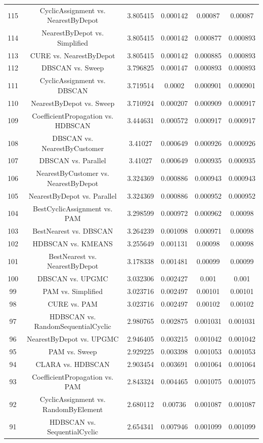 \documentclass[a4paper,10pt]{article}
\begin{document}
\begin{landscape}
\begin{table}[!htp]
\begin{tabular}{cccccc}
115&CyclicAssignment vs. NearestByDepot&3.805415&0.000142&0.00087&0.00087\\
114&NearestByDepot vs. Simplified&3.805415&0.000142&0.000877&0.000893\\
113&CURE vs. NearestByDepot&3.805415&0.000142&0.000885&0.000893\\
112&DBSCAN vs. Sweep&3.796825&0.000147&0.000893&0.000893\\
111&CyclicAssignment vs. DBSCAN&3.719514&0.0002&0.000901&0.000901\\
110&NearestByDepot vs. Sweep&3.710924&0.000207&0.000909&0.000917\\
109&CoefficientPropagation vs. HDBSCAN&3.444631&0.000572&0.000917&0.000917\\
108&DBSCAN vs. NearestByCustomer&3.41027&0.000649&0.000926&0.000926\\
107&DBSCAN vs. Parallel&3.41027&0.000649&0.000935&0.000935\\
106&NearestByCustomer vs. NearestByDepot&3.324369&0.000886&0.000943&0.000943\\
105&NearestByDepot vs. Parallel&3.324369&0.000886&0.000952&0.000952\\
104&BestCyclicAssignment vs. PAM&3.298599&0.000972&0.000962&0.00098\\
103&BestNearest vs. DBSCAN&3.264239&0.001098&0.000971&0.00098\\
102&HDBSCAN vs. KMEANS&3.255649&0.001131&0.00098&0.00098\\
101&BestNearest vs. NearestByDepot&3.178338&0.001481&0.00099&0.00099\\
100&DBSCAN vs. UPGMC&3.032306&0.002427&0.001&0.001\\
99&PAM vs. Simplified&3.023716&0.002497&0.00101&0.00101\\
98&CURE vs. PAM&3.023716&0.002497&0.00102&0.00102\\
97&HDBSCAN vs. RandomSequentialCyclic&2.980765&0.002875&0.001031&0.001031\\
96&NearestByDepot vs. UPGMC&2.946405&0.003215&0.001042&0.001042\\
95&PAM vs. Sweep&2.929225&0.003398&0.001053&0.001053\\
94&CLARA vs. HDBSCAN&2.903454&0.003691&0.001064&0.001064\\
93&CoefficientPropagation vs. PAM&2.843324&0.004465&0.001075&0.001075\\
92&CyclicAssignment vs. RandomByElement&2.680112&0.00736&0.001087&0.001087\\
91&HDBSCAN vs. SequentialCyclic&2.654341&0.007946&0.001099&0.001099\\

\end{tabular}
\end{table}
\end{landscape}
\end{document}
